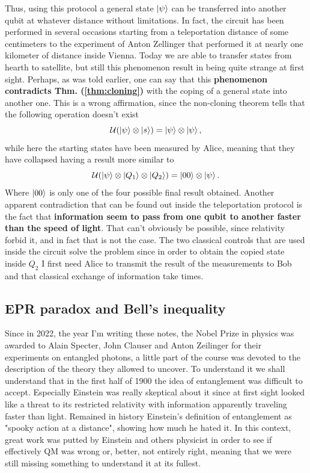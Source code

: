 Thus, using this protocol a general state $\ket{\psi}$ can be transferred into another qubit at whatever distance without limitations. In fact, the circuit has been performed in several occasions starting from a teleportation distance of some centimeters to the experiment of Anton Zellinger that performed it at nearly one kilometer of distance inside Vienna. Today we are able to transfer states from hearth to satellite, but still this phenomenon result in being quite strange at first sight. Perhaps, as was told earlier, one can say that this \textbf{phenomenon contradicts Thm. (\ref{thm:cloning})} with the coping of a general state into another one. This is a wrong affirmation, since the non-cloning theorem tells that the following operation doesn't exist
\begin{equation}
    \mathcal{U}(\ket{\psi}\otimes\ket{s}) = \ket{\psi}\otimes\ket{\psi},
\end{equation}
while here the starting states have been measured by Alice, meaning that they have collapsed having a result more similar to
\begin{equation}
    \mathcal{U}(\ket{\psi}\otimes\ket{Q_1}\otimes\ket{Q_2}) = \ket{00}\otimes\ket{\psi}.
\end{equation}
Where $\ket{00}$ is only one of the four possible final result obtained. Another apparent contradiction that can be found out inside the teleportation protocol is the fact that \textbf{information seem to pass from one qubit to another faster than the speed of light}. That can't obviously be possible, since relativity forbid it, and in fact that is not the case. The two classical controls that are used inside the circuit solve the problem since in order to obtain the copied state inside $Q_2$ I first need Alice to transmit the result of the measurements to Bob and that classical exchange of information take times.

\subsection{EPR paradox and Bell's inequality}

Since in 2022, the year I'm writing these notes, the Nobel Prize in physics was awarded to Alain Specter, John Clauser and Anton Zeilinger for their experiments on entangled photons, a little part of the course was devoted to the description of the theory they allowed to uncover. To understand it we shall understand that in the first half of 1900 the idea of entanglement was difficult to accept. Especially Einstein was really skeptical about it since at first sight looked like a threat to its restricted relativity with information apparently traveling faster than light. Remained in history Einstein's definition of entanglement as "spooky action at a distance", showing how much he hated it. In this context, great work was putted by Einstein and others physicist in order to see if effectively QM was wrong or, better, not entirely right, meaning that we were still missing something to understand it at its fullest.

